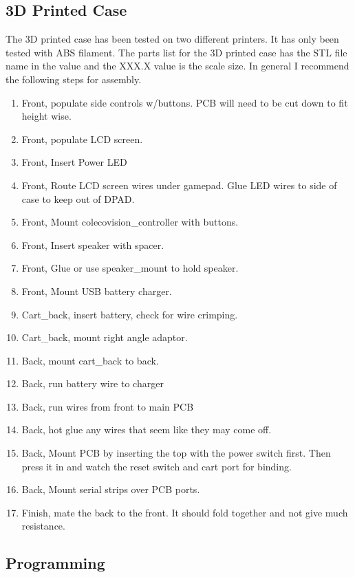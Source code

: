 \subsection{3D Printed Case}

\par
The 3D printed case has been tested on two different printers. It has only been tested with ABS filament.
The parts list for the 3D printed case has the STL file name in the value and the XXX.X value is the scale size.
In general I recommend the following steps for assembly.

\begin{enumerate}
  \item Front, populate side controls w/buttons. PCB will need to be cut down to fit height wise.
  \item Front, populate LCD screen.
  \item Front, Insert Power LED
  \item Front, Route LCD screen wires under gamepad. Glue LED wires to side of case to keep out of DPAD.
  \item Front, Mount colecovision\_controller with buttons.
  \item Front, Insert speaker with spacer.
  \item Front, Glue or use speaker\_mount to hold speaker.
  \item Front, Mount USB battery charger.
  \item Cart\_back, insert battery, check for wire crimping.
  \item Cart\_back, mount right angle adaptor.
  \item Back, mount cart\_back to back.
  \item Back, run battery wire to charger
  \item Back, run wires from front to main PCB
  \item Back, hot glue any wires that seem like they may come off.
  \item Back, Mount PCB by inserting the top with the power switch first. Then press it in and watch the reset switch and cart port for binding.
  \item Back, Mount serial strips over PCB ports.
  \item Finish, mate the back to the front. It should fold together and not give much resistance.
\end{enumerate}


\subsection{Programming}

